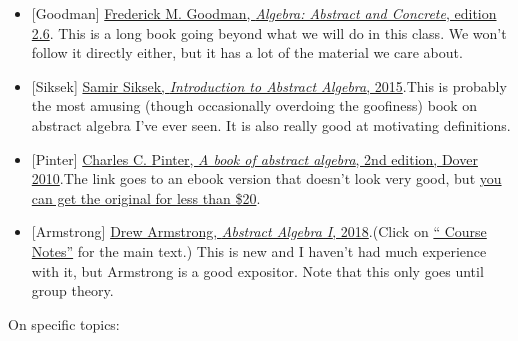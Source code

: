 \documentclass[numbers=enddot,12pt,final,onecolumn,notitlepage]{scrartcl}%
\theoremstyle{definition}
\begin{document}
\begin{itemize}
\item {}[Goodman]
\href{http://homepage.divms.uiowa.edu/~goodman/algebrabook.dir/algebrabook.html}{Frederick
M. Goodman, \textit{Algebra: Abstract and Concrete}, edition 2.6}.\newline
This is a long book going beyond what we will do in this class. We won't
follow it directly either, but it has a lot of the material we care about.

\item {}[Siksek]
\href{http://homepages.warwick.ac.uk/staff/S.Siksek/teaching/aa/aanotes.pdf}{Samir
Siksek, \textit{Introduction to Abstract Algebra}, 2015}.\newline This is
probably the most amusing (though occasionally overdoing the goofiness) book
on abstract algebra I've ever seen. It is also really good at motivating definitions.

\item {}[Pinter]
\href{https://www.amazon.com/Book-Abstract-Algebra-Second-Mathematics/dp/0486474178}{Charles
C. Pinter, \textit{A book of abstract algebra}, 2nd edition, Dover
2010}.\newline The link goes to an ebook version that doesn't look very good,
but \href{http://store.doverpublications.com/0486474178.html}{you can get the
original for less than \$20}.

\item {}[Armstrong]
\href{http://www.math.miami.edu/~armstrong/561fa18.php}{Drew Armstrong,
\textit{Abstract Algebra I}, 2018}.\newline(Click on
\href{http://www.math.miami.edu/~armstrong/561fa18/561fa18notes.pdf}{\textquotedblleft
Course Notes\textquotedblright} for the main text.) This is new and I haven't
had much experience with it, but Armstrong is a good expositor. Note that this
only goes until group theory.
\end{itemize}

On specific topics:
\end{document}
